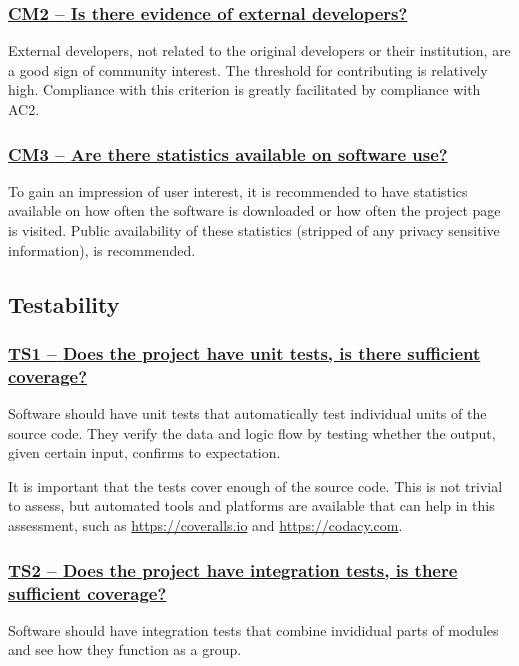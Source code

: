 \documentclass[a4paper,11pt]{article}
\newcommand{\criterion}[1]{\subsubsection*{\underline{#1}}}
\begin{document}
\newcommand{\cmTwoID}{CM2}
\newcommand{\cmTwoText}{Is there evidence of external developers?}
\criterion{\cmTwoID{ }--{ }\cmTwoText}\label{id:cm2} 

External developers, not related to the original developers or their
institution, are a good sign of community interest. The threshold for
contributing is relatively high. Compliance with this criterion is greatly
facilitated by compliance with AC2.

\newcommand{\cmThreeID}{CM3}
\newcommand{\cmThreeText}{Are there statistics available on software use?}
\criterion{\cmThreeID{ }--{ }\cmThreeText}\label{id:cm3} 

To gain an impression of user interest, it is recommended to have statistics
available on how often the software is downloaded or how often the project page
is visited. Public availability of these statistics (stripped of any privacy
sensitive information), is recommended.

\subsection{Testability}\label{sec:tes}

\newcommand{\tsOneID}{TS1}
\newcommand{\tsOneText}{Does the project have unit tests, is there sufficient coverage?}
\criterion{\tsOneID{ }--{ }\tsOneText}\label{id:ts1} 

Software should have unit tests that automatically test individual units of the
source code. They verify the data and logic flow by testing whether the output,
given certain input, confirms to expectation.

It is important that the tests cover enough of the source code. This is not
trivial to assess, but automated tools
and platforms are available that can help in this assessment, such as
\url{https://coveralls.io} and \url{https://codacy.com}.

\newcommand{\tsTwoID}{TS2}
\newcommand{\tsTwoText}{Does the project have integration tests, is there sufficient coverage?}
\criterion{\tsTwoID{ }--{ }\tsTwoText}\label{id:ts2} 

Software should have integration tests that combine invididual parts of modules and see how they function
as a group.
\end{document}
